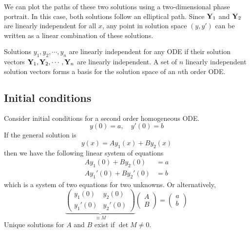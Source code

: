 We can plot the paths of these two solutions using a two-dimensional phase portrait.
In this case, both solutions follow an elliptical path.
Since \(\vb Y_1\) and \(\vb Y_2\) are linearly independent for all \(x\), any point in solution space \((y, y')\) can be written as a linear combination of these solutions.

Solutions \(y_1, y_2, \cdots, y_n\) are linearly independent for any ODE if their solution vectors \(\vb Y_1, \vb Y_2, \cdots, \vb Y_n\) are linearly independent.
A set of \(n\) linearly independent solution vectors forms a basis for the solution space of an \(n\)th order ODE.\@

\subsection{Initial conditions}
Consider initial conditions for a second order homogeneous ODE.\@
\[
	y(0) = a,\quad y'(0) = b
\]
If the general solution is
\[
	y(x) = Ay_1(x) + By_2(x)
\]
then we have the following linear system of equations
\begin{align*}
	Ay_1(0) + By_2(0)   & = a \\
	Ay_1'(0) + By_2'(0) & = b
\end{align*}
which is a system of two equations for two unknowns.
Or alternatively,
\[
	\underbrace{\begin{pmatrix}
			y_1(0)  & y_2(0)  \\
			y_1'(0) & y_2'(0)
		\end{pmatrix}}_{\equiv M}
	\begin{pmatrix}
		A \\ B
	\end{pmatrix}
	=
	\begin{pmatrix}
		a \\b
	\end{pmatrix}
\]
Unique solutions for \(A\) and \(B\) exist if \(\det M \neq 0\).

